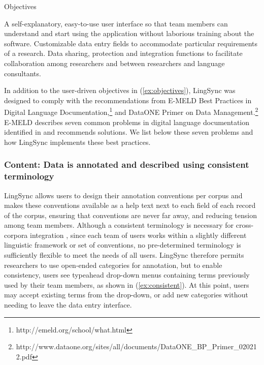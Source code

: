 \documentclass[letterpaper, 12pt, dvips]{mitwpl}
\begin{document}
\begin{exe} 
\ex Objectives

\begin{xlist}
        \ex  A self-explanatory, easy-to-use user interface so that team members can understand and start using the application without laborious training about the software.
        \ex Customizable data entry fields to accommodate particular requirements of a research.  
        \ex  Data sharing, protection and integration functions to facilitate collaboration among researchers and between researchers and language consultants. 
    \end{xlist}
\label{ex:objectives}
\end{exe}


In addition to the user-driven objectives in (\ref{ex:objectives}), LingSync was designed to comply with the recommendations from %
E-MELD Best Practices in Digital Language Documentation,\footnote{http://emeld.org/school/what.html} and %
DataONE Primer on Data Management.\footnote{http://www.dataone.org/sites/all/documents/DataONE\_BP\_Primer\_020212.pdf}
E-MELD describes seven common problems in digital language documentation identified in \cite{Bird:2003} and recommends solutions. We list below these seven problems and how LingSync implements these best practices.




\subsubsection{\textbf{Content}: Data is annotated and described using consistent terminology} 

LingSync allows users to design their annotation conventions per corpus and makes these conventions available as a help text next to each field of each record of the corpus, ensuring that conventions are never far away, and reducing tension among team members.
Although a consistent  terminology is necessary for cross-corpora integration  \citep{Schalley:2012}, since each team of users works within a slightly different linguistic framework or set of conventions, no pre-determined terminology is sufficiently flexible to meet the needs of all users. LingSync therefore permits researchers to use open-ended categories for annotation, but 
to enable consistency, users see typeahead drop-down menus containing terms previously used by their team members, as shown in (\ref{ex:consistent}). At this point, users may accept existing terms from the drop-down, or add new categories without needing to leave the data entry interface.
\end{document}
